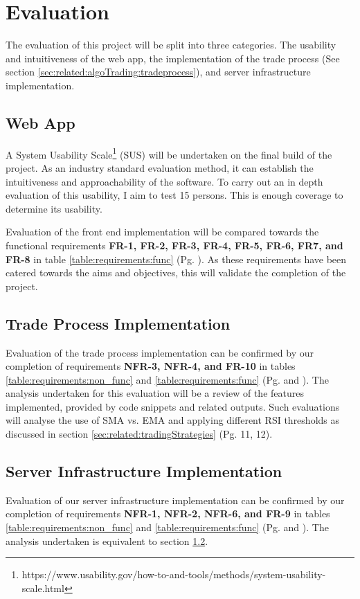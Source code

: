%
\chapter{Evaluation}
\label{sec:evaluation}

The evaluation of this project will be split into three categories. The usability and intuitiveness of the web app, the implementation of the trade process (See section \ref{sec:related:algoTrading:tradeprocess}), and server infrastructure implementation.


\section{Web App}
\label{sec:evaluation:ui}
\noindent A System Usability Scale\footnote{https://www.usability.gov/how-to-and-tools/methods/system-usability-scale.html} (SUS) will be undertaken on the final build of the project. As an industry standard evaluation method, it can establish the intuitiveness and approachability of the software. To carry out an in depth evaluation of this usability, I aim to test 15 persons. This is enough coverage to determine its usability.

Evaluation of the front end implementation will be compared towards the functional requirements \textbf{FR-1, FR-2, FR-3, FR-4, FR-5, FR-6, FR7, and FR-8} in table \ref{table:requirements:func} (Pg. \pageref{table:requirements:func}). As these requirements have been catered towards the aims and objectives, this will validate the completion of the project.


\section{Trade Process Implementation}
\label{sec:evaluation:tradeprocess}
\noindent Evaluation of the trade process implementation can be confirmed by our completion of requirements \textbf{NFR-3, NFR-4, and FR-10} in tables \ref{table:requirements:non_func} and \ref{table:requirements:func} (Pg. \pageref{table:requirements:non_func} and \pageref{table:requirements:func}). The analysis undertaken for this evaluation will be a review of the features implemented, provided by code snippets and related outputs. Such evaluations will analyse the use of SMA vs. EMA and applying different RSI thresholds as discussed in section \ref{sec:related:tradingStrategies} (Pg. 11, 12).



\section{Server Infrastructure Implementation}
\label{sec:evaluation:simulteneous}
Evaluation of our server infrastructure implementation can be confirmed by our completion of requirements \textbf{NFR-1, NFR-2, NFR-6, and FR-9} in tables \ref{table:requirements:non_func} and \ref{table:requirements:func} (Pg. \pageref{table:requirements:non_func} and \pageref{table:requirements:func}). The analysis undertaken is equivalent to section \ref{sec:evaluation:tradeprocess}.